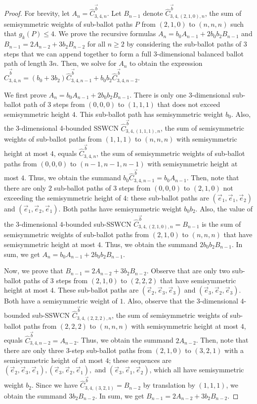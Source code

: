 \documentclass[11pt]{article}
\theoremstyle{remark}
\theoremstyle{definition}
\begin{document}
\begin{proof}
    For brevity, let $A_n = \widehat{C}_{3, 4,n}^{\vec{b}}$. Let  $B_{n-1}$ denote $\widehat{C}_{3, 4, (2, 1, 0), n}^{\vec{b}}$, the sum of semisymmetric weights of sub-ballot paths $P$ from $(2,1,0)$ to $(n,n,n)$ such that $g_k(P) \leq 4$. We prove the recursive formulas $A_n = b_0 A_{n-1}+2b_0b_2B_{n-1}$ and $B_{n-1} = 2A_{n-2}+3b_2 B_{n-2}$ for all $n \geq 2$  by considering the sub-ballot paths of 3 steps that we can append together to form a full 3-dimensional balanced ballot path of length $3n$. Then, we solve for $A_n$ to obtain the expression $\widehat{C}_{3, 4, n}^{\vec{b}} = (b_0+3b_2) \widehat{C}_{3, 4, n-1}^{\vec{b}} + b_0b_2\widehat{C}_{3, 4, n-2}^{\vec{b}}$.

    We first prove $A_n = b_0A_{n-1}+2b_0b_2B_{n-1}$. There is only one 3-dimensional sub-ballot path of $3$ steps from $(0, 0, 0)$ to $(1, 1, 1)$ that does not exceed semisymmetric height $4$. This sub-ballot path has semisymmetric weight $b_0$. Also, the 3-dimensional 4-bounded SSWCN $\widehat{C}_{3, 4, (1, 1, 1), n}^{\vec{b}}$, the sum of semisymmetric weights of sub-ballot paths from $(1, 1, 1)$ to $(n, n, n)$ with semisymmetric height at most $4$, equals $\widehat{C}_{3, 4, n}^{\vec{b}}$, the sum of semisymmetric weights of sub-ballot paths from $(0, 0, 0)$ to $(n-1, n-1, n-1)$ with semisymmetric height at most $4$. Thus, we obtain the summand $b_0\widehat{C}_{3, 4, n-1}^{\vec{b}} = b_0A_{n-1}$. Then, note that there are only $2$ sub-ballot paths of $3$ steps from $(0, 0, 0)$ to $(2, 1, 0)$ not exceeding the semisymmetric height of $4$: these sub-ballot paths are $(\vec{e}_1, \vec{e}_1, \vec{e}_2)$ and $(\vec{e}_1, \vec{e}_2, \vec{e}_1)$. Both paths have semisymmetric weight $b_0b_2$. Also, the value of the $3$-dimensional $4$-bounded sub-SSWCN $\widehat{C}_{3, 4, (2, 1, 0), n}^{\vec{b}} = B_{n-1}$ is the sum of semisymmetric weights of sub-ballot paths from $(2, 1, 0)$ to $(n, n, n)$ that have semisymmetric height at most $4$. Thus, we obtain the summand $2b_0b_2B_{n-1}$. In sum, we get $A_n = b_0A_{n-1}+2b_0b_2B_{n-1}$.
    
    Now, we prove that $B_{n-1} = 2A_{n-2}+3b_2B_{n-2}$. Observe that are only two sub-ballot paths of $3$ steps from $(2, 1, 0)$ to $(2, 2, 2)$ that have semisymmetric height at most $4$. These sub-ballot paths are $(\vec{e}_2, \vec{e}_3, \vec{e}_3)$ and $(\vec{e}_3, \vec{e}_2, \vec{e}_3)$. Both have a semisymmetric weight of $1$. Also, observe that the $3$-dimensional $4$-bounded sub-SSWCN $\widehat{C}_{3, 4, (2, 2, 2), n}^{\vec{b}}$, the sum of semisymmetric weights of sub-ballot paths from $(2, 2,2)$ to $(n, n, n)$ with semisymmetric height at most $4$, equals $\widehat{C}_{3, 4, n-2}^{\vec{b}} = A_{n-2}$. Thus, we obtain the summand $2A_{n-2}$. Then, note that there are only three 3-step sub-ballot paths from $(2, 1, 0)$ to $(3, 2, 1)$ with a semisymmetric height of at most $4$; these sequences are $(\vec{e}_2, \vec{e}_3, \vec{e}_1), (\vec{e}_3, \vec{e}_2, \vec{e}_1),$ and $(\vec{e}_3, \vec{e}_1, \vec{e}_2)$, which all have semisymmetric weight $b_2$. Since we have $\widehat{C}_{3,4, (3, 2, 1)}^{\vec{b}} = B_{n-2}$ by translation by $(1, 1, 1)$, we obtain the summand $3b_2B_{n-2}$. In sum, we get $B_{n-1} = 2A_{n-2}+3b_2 B_{n-2}$.



\end{proof}
\end{document}
